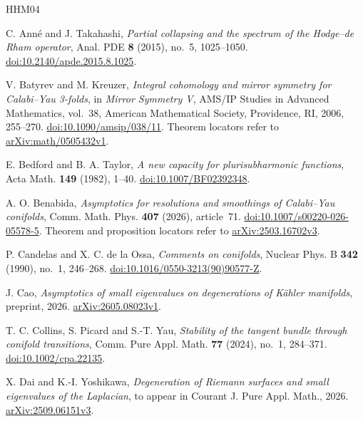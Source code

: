 \begin{thebibliography}{HHM04}

C. Ann\'e and J. Takahashi,
\emph{Partial collapsing and the spectrum of the Hodge--de Rham operator},
Anal. PDE \textbf{8} (2015), no.~5, 1025--1050.
\href{https://doi.org/10.2140/apde.2015.8.1025}{doi:10.2140/apde.2015.8.1025}.

V. Batyrev and M. Kreuzer,
\emph{Integral cohomology and mirror symmetry for Calabi--Yau 3-folds},
in \emph{Mirror Symmetry V}, AMS/IP Studies in Advanced Mathematics,
vol.~38, American Mathematical Society, Providence, RI, 2006, 255--270.
\href{https://doi.org/10.1090/amsip/038/11}{doi:10.1090/amsip/038/11}.
Theorem locators refer to
\href{https://arxiv.org/abs/math/0505432v1}{arXiv:math/0505432v1}.

E. Bedford and B. A. Taylor,
\emph{A new capacity for plurisubharmonic functions},
Acta Math. \textbf{149} (1982), 1--40.
\href{https://doi.org/10.1007/BF02392348}{doi:10.1007/BF02392348}.

A. O. Benabida,
\emph{Asymptotics for resolutions and smoothings of Calabi--Yau conifolds},
Comm. Math. Phys. \textbf{407} (2026), article~71.
\href{https://doi.org/10.1007/s00220-026-05578-5}{doi:10.1007/s00220-026-05578-5}.
Theorem and proposition locators refer to
\href{https://arxiv.org/abs/2503.16702v3}{arXiv:2503.16702v3}.

P. Candelas and X. C. de la Ossa,
\emph{Comments on conifolds},
Nuclear Phys. B \textbf{342} (1990), no.~1, 246--268.
\href{https://doi.org/10.1016/0550-3213(90)90577-Z}{doi:10.1016/0550-3213(90)90577-Z}.

J. Cao,
\emph{Asymptotics of small eigenvalues on degenerations of K\"ahler manifolds},
preprint, 2026.
\href{https://arxiv.org/abs/2605.08023v1}{arXiv:2605.08023v1}.

T. C. Collins, S. Picard and S.-T. Yau,
\emph{Stability of the tangent bundle through conifold transitions},
Comm. Pure Appl. Math. \textbf{77} (2024), no.~1, 284--371.
\href{https://doi.org/10.1002/cpa.22135}{doi:10.1002/cpa.22135}.

X. Dai and K.-I. Yoshikawa,
\emph{Degeneration of Riemann surfaces and small eigenvalues of the Laplacian},
to appear in Courant J. Pure Appl. Math., 2026.
\href{https://arxiv.org/abs/2509.06151v3}{arXiv:2509.06151v3}.


\end{thebibliography}
